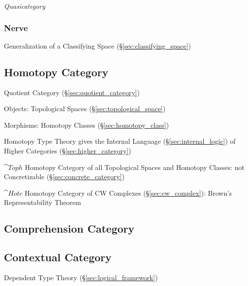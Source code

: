 \emph{Quasicategory}



\subsubsection{Nerve}\label{sec:nerve}

Generalization of a Classifying Space (\S\ref{sec:classifying_space})



\subsection{Homotopy Category}\label{sec:homotopy_category}

Quotient Category (\S\ref{sec:quotient_category})

Objects: Topological Spaces (\S\ref{sec:topological_space})

Morphisms: Homotopy Classes (\S\ref{sec:homotopy_class})

Homotopy Type Theory gives the Internal Language
(\S\ref{sec:internal_logic}) of Higher Categories
(\S\ref{sec:higher_category})

$\cat{Toph}$ Homotopy Category of all Topological Spaces and Homotopy
Classes: not Concretizable (\S\ref{sec:concrete_category})

$\cat{Hotc}$ Homotopy Category of CW Complexes
(\S\ref{sec:cw_complex}): Brown's Representability Theorem



\subsection{Comprehension Category}\label{sec:comprehension_category}

\subsection{Contextual Category}\label{sec:contextual_category}

Dependent Type Theory (\S\ref{sec:logical_framework})



